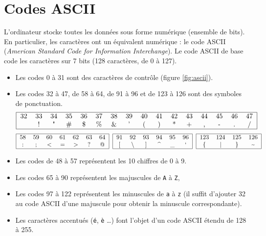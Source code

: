 
\section{Codes ASCII}\label{ascii}
L'ordinateur stocke toutes les données sous forme numérique
(ensemble de bits). En particulier, les caractères ont un équivalent numérique : 
le code ASCII ({\em American Standard Code for Information Interchange}). 
Le code ASCII de base code les caractères sur 7 bits (128 caractères, de 0 à 127).
\begin{itemize}
\item Les codes 0 à 31 sont des caractères de contrôle (figure \ref{fig:ascii}).
\item Les codes 32 à 47, de 58 à 64, de 91 à 96 et de 123 à 126 
	sont des symboles de ponctuation.
{\footnotesize\tt$$\begin{tabular}{|cccccccccccccccc|}
\hline
32 & 33 & 34 & 35 & 36 & 37 & 38 & 39 & 40 & 41 & 42 & 43 & 44 & 45 & 46 & 47 \\
   & !  & " 	& \# & \$ & \% & \& & '  & (  &	)  & * 	& +  & ,  & -  & .  & / \\
\hline
\end{tabular}$$}
{\footnotesize\tt$$\begin{tabular}{|ccccccc|}
\hline
58 & 59 & 60 & 61 & 62 & 63 & 64 \\
:  & ;  & <  & =  & >  & ?  & @	\\
\hline
\end{tabular}\hspace*{2mm}
\begin{tabular}{|cccccc|}
\hline
91 & 92 & 93 & 94 & 95 & 96 \\
\char`[ & \char`\\ & \char`] & \char`^ & \_ & ` \\
\hline
\end{tabular}\hspace*{2mm}
\begin{tabular}{|cccc|}
\hline
123 & 124 & 125 & 126 \\
 \{  & |  & \}  & \char`~ \\
\hline
\end{tabular}$$}
\item Les codes de 48 à 57 représentent les 10 chiffres de 0 à 9.
\item Les codes 65 à 90 représentent les majuscules de {\tt A} à {\tt Z},
\item Les codes 97 à 122 représentent les minuscules de {\tt a} à {\tt z}
	(il suffit d'ajouter 32 au code ASCII d'une majuscule
	pour obtenir la minuscule correspondante).
\item Les caractères accentués ({\tt é}, {\tt è} \ldots) font l'objet d'un code ASCII étendu
	de 128 à 255.
\end{itemize}
